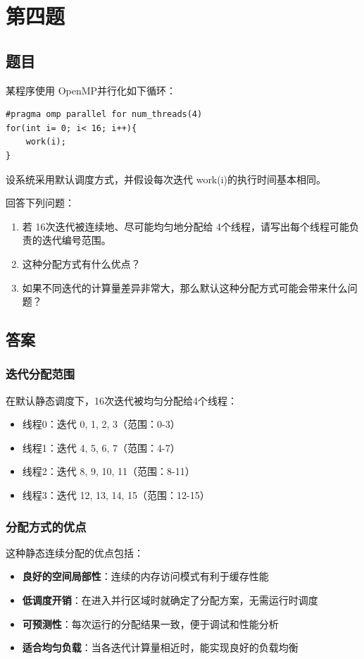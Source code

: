 \chapter{第四题}

\section{题目}

某程序使用 OpenMP并行化如下循环：
\begin{lstlisting}[style=cleancpp]
#pragma omp parallel for num_threads(4) 
for(int i= 0; i< 16; i++){ 
    work(i); 
}
\end{lstlisting}
设系统采用默认调度方式，并假设每次迭代 work(i)的执行时间基本相同。

回答下列问题：
\begin{enumerate}
    \item 若 16次迭代被连续地、尽可能均匀地分配给 4个线程，请写出每个线程可能负责的迭代编号范围。
    \item 这种分配方式有什么优点？
    \item 如果不同迭代的计算量差异非常大，那么默认这种分配方式可能会带来什么问题？
\end{enumerate}

\section{答案}
\subsection{迭代分配范围}

在默认静态调度下，16次迭代被均匀分配给4个线程：

\begin{itemize}
    \item 线程0：迭代 0, 1, 2, 3（范围：0-3）
    \item 线程1：迭代 4, 5, 6, 7（范围：4-7）
    \item 线程2：迭代 8, 9, 10, 11（范围：8-11）
    \item 线程3：迭代 12, 13, 14, 15（范围：12-15）
\end{itemize}

\subsection{分配方式的优点}

这种静态连续分配的优点包括：
\begin{itemize}
    \item \textbf{良好的空间局部性}：连续的内存访问模式有利于缓存性能
    \item \textbf{低调度开销}：在进入并行区域时就确定了分配方案，无需运行时调度
    \item \textbf{可预测性}：每次运行的分配结果一致，便于调试和性能分析
    \item \textbf{适合均匀负载}：当各迭代计算量相近时，能实现良好的负载均衡
\end{itemize}

